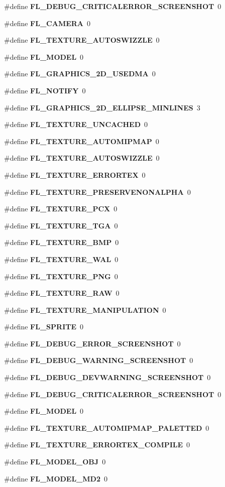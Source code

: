 \begin{CompactItemize}
\item 
\#define {\bf FL\_\-DEBUG\_\-CRITICALERROR\_\-SCREENSHOT}~0
\item 
\#define {\bf FL\_\-CAMERA}~0
\item 
\#define {\bf FL\_\-TEXTURE\_\-AUTOSWIZZLE}~0
\item 
\#define {\bf FL\_\-MODEL}~0
\item 
\#define {\bf FL\_\-GRAPHICS\_\-2D\_\-USEDMA}~0
\item 
\#define {\bf FL\_\-NOTIFY}~0
\item 
\#define {\bf FL\_\-GRAPHICS\_\-2D\_\-ELLIPSE\_\-MINLINES}~3
\item 
\#define {\bf FL\_\-TEXTURE\_\-UNCACHED}~0
\item 
\#define {\bf FL\_\-TEXTURE\_\-AUTOMIPMAP}~0
\item 
\#define {\bf FL\_\-TEXTURE\_\-AUTOSWIZZLE}~0
\item 
\#define {\bf FL\_\-TEXTURE\_\-ERRORTEX}~0
\item 
\#define {\bf FL\_\-TEXTURE\_\-PRESERVENONALPHA}~0
\item 
\#define {\bf FL\_\-TEXTURE\_\-PCX}~0
\item 
\#define {\bf FL\_\-TEXTURE\_\-TGA}~0
\item 
\#define {\bf FL\_\-TEXTURE\_\-BMP}~0
\item 
\#define {\bf FL\_\-TEXTURE\_\-WAL}~0
\item 
\#define {\bf FL\_\-TEXTURE\_\-PNG}~0
\item 
\#define {\bf FL\_\-TEXTURE\_\-RAW}~0
\item 
\#define {\bf FL\_\-TEXTURE\_\-MANIPULATION}~0
\item 
\#define {\bf FL\_\-SPRITE}~0
\item 
\#define {\bf FL\_\-DEBUG\_\-ERROR\_\-SCREENSHOT}~0
\item 
\#define {\bf FL\_\-DEBUG\_\-WARNING\_\-SCREENSHOT}~0
\item 
\#define {\bf FL\_\-DEBUG\_\-DEVWARNING\_\-SCREENSHOT}~0
\item 
\#define {\bf FL\_\-DEBUG\_\-CRITICALERROR\_\-SCREENSHOT}~0
\item 
\#define {\bf FL\_\-MODEL}~0
\item 
\#define {\bf FL\_\-TEXTURE\_\-AUTOMIPMAP\_\-PALETTED}~0
\item 
\#define {\bf FL\_\-TEXTURE\_\-ERRORTEX\_\-COMPILE}~0
\item 
\#define {\bf FL\_\-MODEL\_\-OBJ}~0
\item 
\#define {\bf FL\_\-MODEL\_\-MD2}~0

\end{CompactItemize}
